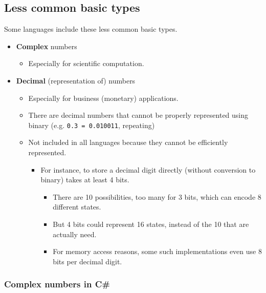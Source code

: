 \documentclass[11pt]{article}
\theoremstyle{definition}
\begin{document}
\subsection{Less common basic types}
\label{sec:org7b3d780}

Some languages include these less common basic types.
\begin{itemize}
\item \textbf{Complex} numbers
\begin{itemize}
\item Especially for scientific computation.
\end{itemize}
\item \textbf{Decimal} (representation of) numbers
\begin{itemize}
\item Especially for business (monetary) applications.
\item There are decimal numbers that cannot be properly represented
using binary (e.g. \texttt{0.3 = 0.010011}, repeating)
\item Not included in all languages because
they cannot be efficiently represented.
\begin{itemize}
\item For instance, to store a decimal digit directly
(without conversion to binary) takes at least 4 bits.
\begin{itemize}
\item There are 10 possibilities, too many for 3 bits, which can
encode 8 different states.
\item But 4 bits could represent 16 states, instead of the 10
that are actually need.
\item For memory access reasons, some such implementations
even use 8 bits per decimal digit.
\end{itemize}
\end{itemize}
\end{itemize}
\end{itemize}

\subsubsection{Complex numbers in C\#}
\label{sec:org06c4a1d}
\end{document}
